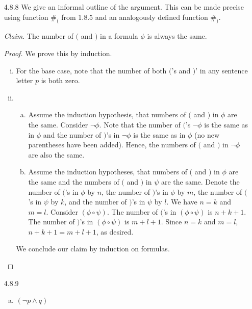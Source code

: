\begin{enumerate}
	\item[4.8.8] We give an informal outline of the argument. This can be made precise using function $\#_($ from 1.8.5 and an analogously defined function $\#_)$.
	
	\emph{Claim}. The number of $($ and $)$ in a formula $\phi$ is always the same. 
	
	\begin{proof}
	We prove this by induction.
	
	\begin{enumerate}[(i)]
	
		\item For the base case, note that the number of both $($'s and $)$' in any sentence letter $p$ is both zero.
		
		\item \begin{enumerate}[(a)]
		
			\item Assume the induction hypothesis, that numbers of $($ and $)$ in $\phi$ are the same. Consider $\neg\phi$. Note that the number of $($'s $\neg\phi$ is the same as in $\phi$ and the number of $)$'s in $\neg\phi$ is the same as in $\phi$ (no new parentheses have been added). Hence, the numbers of $($ and $)$ in $\neg\phi$ are also the same.
			
			\item Assume the induction hypotheses, that numbers of $($ and $)$ in $\phi$ are the same and the numbers of $($ and $)$ in $\psi$ are the same. Denote the number of $($'s in $\phi$ by $n$, the number of $)$'s in $\phi$ by $m$, the number of $($'s in $\psi$ by $k$, and the number of $)$'s in $\psi$ by $l$. We have $n=k$ and $m=l$. Consider $(\phi\circ\psi)$. The number of $($'s in $(\phi\circ\psi)$ is $n+k+1$. The number of $)$'s in $(\phi\circ\psi)$ is $m+l+1$. Since  $n=k$ and $m=l$,  $n+k+1=m+l+1$, as desired.
	
		\end{enumerate}
		We conclude our claim by induction on formulas.
	
	\end{enumerate}
	
	\end{proof}
		
	\item[4.8.9]
	
		\begin{enumerate}[(a)]
		
		

\item $(\neg p\land q)$


\end{enumerate}
\end{enumerate}

